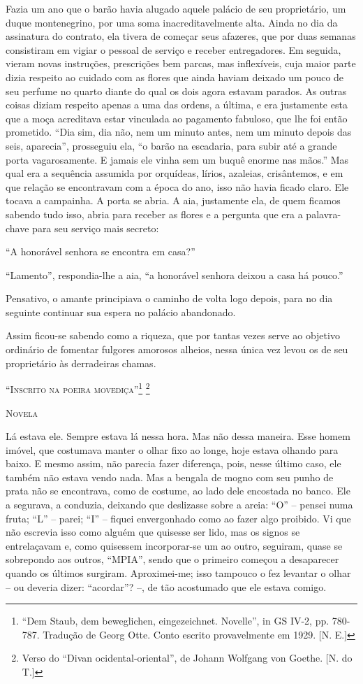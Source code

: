 Fazia um ano que o barão havia alugado aquele palácio de seu
proprietário, um duque montenegrino, por uma soma inacreditavelmente
alta. Ainda no dia da assinatura do contrato, ela tivera de começar seus
afazeres, que por duas semanas consistiram em vigiar o pessoal de
serviço e receber entregadores. Em seguida, vieram novas instruções,
prescrições bem parcas, mas inflexíveis, cuja maior parte dizia respeito
ao cuidado com as flores que ainda haviam deixado um pouco de seu
perfume no quarto diante do qual os dois agora estavam parados. As
outras coisas diziam respeito apenas a uma das ordens, a última, e era
justamente esta que a moça acreditava estar vinculada ao pagamento
fabuloso, que lhe foi então prometido. ``Dia sim, dia não, nem um minuto
antes, nem um minuto depois das seis, aparecia'', prosseguiu ela, ``o
barão na escadaria, para subir até a grande porta vagarosamente. E
jamais ele vinha sem um buquê enorme nas mãos.'' Mas qual era a
sequência assumida por orquídeas, lírios, azaleias, crisântemos, e em
que relação se encontravam com a época do ano, isso não havia ficado
claro. Ele tocava a campainha. A porta se abria. A aia, justamente ela,
de quem ficamos sabendo tudo isso, abria para receber as flores e a
pergunta que era a palavra-chave para seu serviço mais secreto:

``A honorável senhora se encontra em casa?''

``Lamento'', respondia-lhe a aia, ``a honorável senhora deixou a casa há
pouco.''

Pensativo, o amante principiava o caminho de volta logo depois, para no
dia seguinte continuar sua espera no palácio abandonado.

Assim ficou-se sabendo como a riqueza, que por tantas vezes serve ao
objetivo ordinário de fomentar fulgores amorosos alheios, nessa única
vez levou os de seu proprietário às derradeiras chamas.

``\textsc{Inscrito na poeira movediça''}\footnote{``Dem Staub, dem
  beweglichen, eingezeichnet. Novelle'', in GS IV-2, pp. 780-787.
  Tradução de Georg Otte. Conto escrito provavelmente em 1929. {[}N.
  E.{]}} \footnote{Verso do ``Divan ocidental-oriental'', de Johann
  Wolfgang von Goethe. {[}N. do T.{]}}

\textsc{Novela}

Lá estava ele. Sempre estava lá nessa hora. Mas não dessa maneira. Esse
homem imóvel, que costumava manter o olhar fixo ao longe, hoje estava
olhando para baixo. E mesmo assim, não parecia fazer diferença, pois,
nesse último caso, ele também não estava vendo nada. Mas a bengala de
mogno com seu punho de prata não se encontrava, como de costume, ao lado
dele encostada no banco. Ele a segurava, a conduzia, deixando que
deslizasse sobre a areia: ``O'' -- pensei numa fruta; ``L'' -- parei;
``I'' -- fiquei envergonhado como ao fazer algo proibido. Vi que não
escrevia isso como alguém que quisesse ser lido, mas os signos se
entrelaçavam e, como quisessem incorporar-se um ao outro, seguiram,
quase se sobrepondo aos outros, ``MPIA'', sendo que o primeiro começou a
desaparecer quando os últimos surgiram. Aproximei-me; isso tampouco o
fez levantar o olhar -- ou deveria dizer: ``acordar''? --, de tão
acostumado que ele estava comigo.

